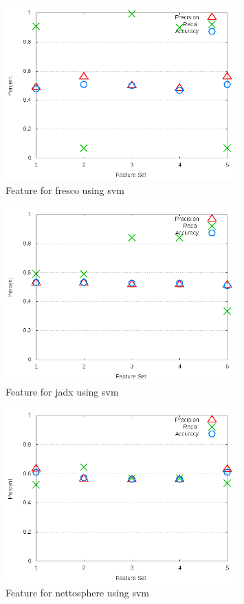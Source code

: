 \begin{figure}[!t]
\centering
\includegraphics[width=0.8\textwidth]{images/svm/test_3/fresco_sample_range.png}
\caption{Feature for fresco using \gls{svm}}
\label{fig:test_3_fresco_svm}
\end{figure}

\begin{figure}[!t]
\centering
\includegraphics[width=0.8\textwidth]{images/svm/test_3/jadx_sample_range.png}
\caption{Feature for jadx using \gls{svm}}
\label{fig:test_3_jadx_svm}
\end{figure}

\begin{figure}[!t]
\centering
\includegraphics[width=0.8\textwidth]{images/svm/test_3/nettosphere_sample_range.png}
\caption{Feature for nettosphere using \gls{svm}}
\label{fig:test_3_nettosphere_svm}
\end{figure}

